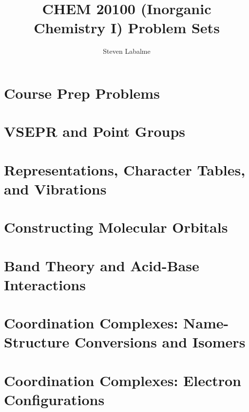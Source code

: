 \documentclass[titlepage]{article}
\title{CHEM 20100 (Inorganic Chemistry I) Problem Sets}
\author{Steven Labalme}
\begin{document}
\maketitle



\tableofcontents
\newpage



\pagestyle{main}
\renewcommand{\leftmark}{Problem Set \thesection}
\setcounter{section}{-1}
\section{Course Prep Problems}

\newpage



\section{VSEPR and Point Groups}

\newpage



\section{Representations, Character Tables, and Vibrations}

\newpage



\section{Constructing Molecular Orbitals}

\newpage



\section{Band Theory and Acid-Base Interactions}

\newpage



\section{Coordination Complexes: Name-Structure Conversions and Isomers}

\newpage



\section{Coordination Complexes: Electron Configurations}

\newpage
\end{document}

